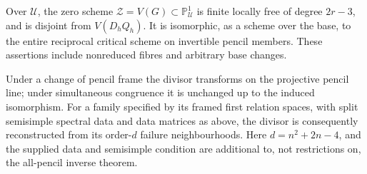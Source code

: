 \begin{theorem}
\label{thm:projective-critical-v144}
Over \(\mathscr U\), the zero scheme
\(\mathscr Z=V(G)\subset\mathbb P^1_{\mathscr U}\) is finite
locally free of degree \(2r-3\), and is disjoint from
\(V(D_hQ_h)\).  It is isomorphic, as a scheme over the base, to
the entire reciprocal critical scheme on invertible pencil members.
These assertions include nonreduced fibres and arbitrary base changes.

Under a change of pencil frame the divisor transforms on the
projective pencil line; under simultaneous congruence it is unchanged
up to the induced isomorphism.  For a family specified by its framed
first relation spaces, with split semisimple spectral data and data
matrices as above, the divisor is consequently reconstructed from
its order-\(d\) failure neighbourhoods.  Here
\(d=n^2+2n-4\), and the supplied data and semisimple condition are
additional to, not restrictions on, the all-pencil inverse theorem.
\end{theorem}
